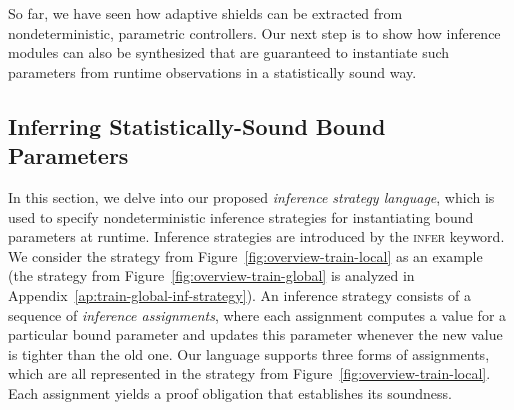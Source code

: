 \documentclass[acmsmall,screen,nonacm]{acmart}
\begin{document}
So far, we have seen how adaptive shields can be extracted from nondeterministic, parametric controllers. Our next step is to show how inference modules can also be synthesized that are guaranteed to instantiate such parameters from runtime observations in a statistically sound way.


\subsection{Inferring Statistically-Sound Bound Parameters}\label{sec:overview-inference}


In this section, we delve into our proposed \emph{inference strategy language}, which is used to specify nondeterministic inference strategies for instantiating bound parameters at runtime. Inference strategies are introduced by the \textsc{infer} keyword. We consider the strategy from Figure~\ref{fig:overview-train-local} as an example (the strategy from Figure~\ref{fig:overview-train-global} is analyzed in Appendix~\ref{ap:train-global-inf-strategy}). An inference strategy consists of a sequence of \emph{inference assignments}, where each assignment computes a value for a particular bound parameter and updates this parameter whenever the new value is tighter than the old one. Our language supports three forms of assignments, which are all represented in the strategy from Figure~\ref{fig:overview-train-local}. Each assignment yields a proof obligation that establishes its soundness.
\end{document}
